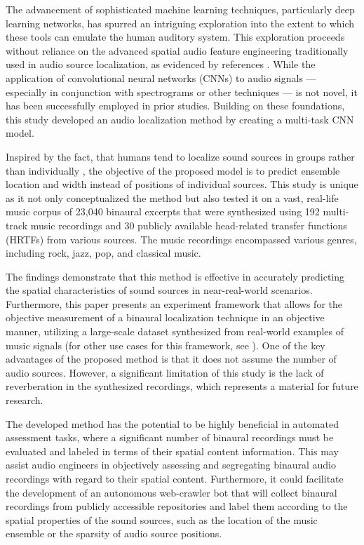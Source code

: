 \documentclass{article}
\begin{document}
The advancement of sophisticated machine learning techniques, particularly deep learning networks, has spurred an intriguing exploration into the extent to which these tools can emulate the human auditory system. This exploration proceeds without reliance on the advanced spatial audio feature engineering traditionally used in audio source localization, as evidenced by references \cite{yang_deepear_2022, vera-diaz_towards_2018, pang_multitask_2019}. While the application of convolutional neural networks (CNNs) \cite{lecun_handwritten_1989} to audio signals --- especially in conjunction with spectrograms \cite{thomas_analyzing_2014, espi_exploiting_2015} or other techniques \cite{abdel-hamid_applying_2012, sainath_deep_2013} --- is not novel, it has been successfully employed in prior studies. Building on these foundations, this study developed an audio localization method by creating a multi-task CNN model.

Inspired by the fact, that humans tend to localize sound sources in groups rather than individually \cite{bregman_auditory_1990, rumsey_spatial_2002}, the objective of the proposed model is to predict ensemble location and width instead of positions of individual sources. This study is unique as it not only conceptualized the method but also tested it on a vast, real-life music corpus of 23,040 binaural excerpts that were synthesized using 192 multi-track music recordings and 30 publicly available head-related transfer functions (HRTFs) from various sources. The music recordings encompassed various genres, including rock, jazz, pop, and classical music.

The findings demonstrate that this method is effective in accurately predicting the spatial characteristics of sound sources in near-real-world scenarios. Furthermore, this paper presents an experiment framework that allows for the objective measurement of a binaural localization technique in an objective manner, utilizing a large-scale dataset synthesized from real-world examples of music signals (for other use cases for this framework, see \cite{antoniuk2023blind, zielinski_automatic_2022, zielinski_spatial_2022, zielinski_comparison_2020}). One of the key advantages of the proposed method is that it does not assume the number of audio sources. However, a significant limitation of this study is the lack of reverberation in the synthesized recordings, which represents a material for future research.

The developed method has the potential to be highly beneficial in automated assessment tasks, where a significant number of binaural recordings must be evaluated and labeled in terms of their spatial content information. This may assist audio engineers in objectively assessing and segregating binaural audio recordings with regard to their spatial content. Furthermore, it could facilitate the development of an autonomous web-crawler bot that will collect binaural recordings from publicly accessible repositories and label them according to the spatial properties of the sound sources, such as the location of the music ensemble or the sparsity of audio source positions.
\end{document}

